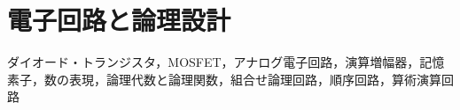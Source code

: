 \chapter{電子回路と論理設計}
ダイオード・トランジスタ，MOSFET，アナログ電子回路，演算増幅器，記憶素子，数の表現，論理代数と論理関数，組合せ論理回路，順序回路，算術演算回路

\newpage